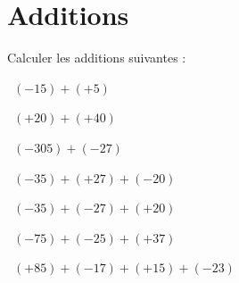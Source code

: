 
\section{Additions}

Calculer les additions suivantes :
\begin{questions}
	
	\question[1]  $(-15) + (+ 5)$
	\fillwithdottedlines{1cm}
	\begin{solution}
		
	\end{solution}
	
	\question[1]  $(+20) + (+ 40)$
	\fillwithdottedlines{1cm}
	\begin{solution}
		
	\end{solution}
	
	
	
	
	\question[1]  $(-305) + (-27)$
	\fillwithdottedlines{1cm}
	\begin{solution}
		
	\end{solution}
	
	
	\question[1]  $(-35) + (+27)  + (-20)$
	\fillwithdottedlines{1.5cm}
	\begin{solution}
		
	\end{solution}
	
	
	\question[2]  $(-35) + (-27)  + (+20)$
	\fillwithdottedlines{1.5cm}
	\begin{solution}
		
	\end{solution}
	
	
	
	
	\question[2]  $(-75) + (-25) + (+37)$
	\fillwithdottedlines{1.5cm}
	\begin{solution}
		
	\end{solution}
	
	
	\question[2]  $(+85) + (-17) + (+15) + (-23)$ 
	\fillwithdottedlines{2cm}
	\begin{solution}
		
	\end{solution}
	
	
%		
\end{questions}

